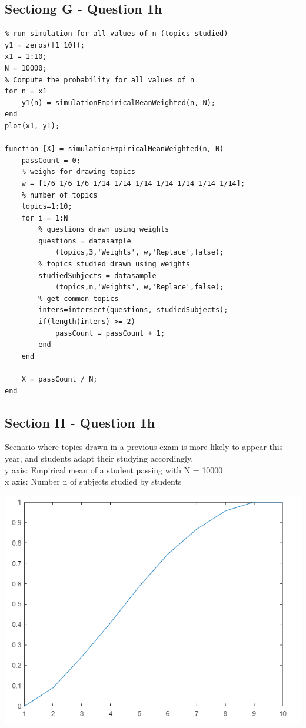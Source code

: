 \documentclass{article}
\begin{document}
\subsection*{Sectiong G - Question 1h}
\begin{lstlisting}
% run simulation for all values of n (topics studied)
y1 = zeros([1 10]);
x1 = 1:10;
N = 10000;
% Compute the probability for all values of n
for n = x1
    y1(n) = simulationEmpiricalMeanWeighted(n, N);
end
plot(x1, y1);

function [X] = simulationEmpiricalMeanWeighted(n, N)
    passCount = 0;
    % weighs for drawing topics
    w = [1/6 1/6 1/6 1/14 1/14 1/14 1/14 1/14 1/14 1/14];
    % number of topics
    topics=1:10;
    for i = 1:N
        % questions drawn using weights
        questions = datasample
            (topics,3,'Weights', w,'Replace',false);
        % topics studied drawn using weights
        studiedSubjects = datasample
            (topics,n,'Weights', w,'Replace',false);
        % get common topics
        inters=intersect(questions, studiedSubjects);
        if(length(inters) >= 2)
            passCount = passCount + 1;
        end 
    end
    
    X = passCount / N;
end 
\end{lstlisting}

\subsection*{Section H - Question 1h}
Scenario where topics drawn in a previous exam is more likely
to appear this year, and students adapt their studying accordingly.\\
y axis: Empirical mean of a student passing with N = 10000 \\
x axis: Number n of subjects studied by students
\begin{center}
    \includegraphics[scale=0.5]{p3}
\end{center}
\end{document}
